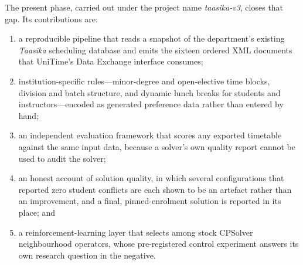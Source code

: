 \documentclass[journal]{IEEEtran}
\begin{document}
The present phase, carried out under the project name \emph{taasika-v3}, closes that gap. Its contributions are:
\begin{enumerate}
\item a reproducible pipeline that reads a snapshot of the department's existing \emph{Taasika} scheduling database and emits the sixteen ordered XML documents that UniTime's Data Exchange interface consumes;
\item institution-specific rules---minor-degree and open-elective time blocks, division and batch structure, and dynamic lunch breaks for students and instructors---encoded as generated preference data rather than entered by hand;
\item an independent evaluation framework that scores any exported timetable against the same input data, because a solver's own quality report cannot be used to audit the solver;
\item an honest account of solution quality, in which several configurations that reported zero student conflicts are each shown to be an artefact rather than an improvement, and a final, pinned-enrolment solution is reported in its place; and
\item a reinforcement-learning layer that selects among stock CPSolver neighbourhood operators, whose pre-registered control experiment answers its own research question in the negative.
\end{enumerate}
\end{document}
